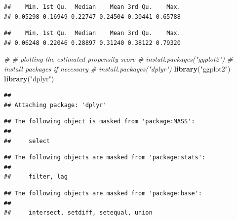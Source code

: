 \documentclass[
  10pt,
]{book}
\newenvironment{Shaded}{\begin{snugshade}}{\end{snugshade}}
\newcommand{\CommentTok}[1]{\textcolor[rgb]{0.56,0.35,0.01}{\textit{#1}}}
\newcommand{\DecValTok}[1]{\textcolor[rgb]{0.00,0.00,0.81}{#1}}
\newcommand{\KeywordTok}[1]{\textcolor[rgb]{0.13,0.29,0.53}{\textbf{#1}}}
\newcommand{\NormalTok}[1]{#1}
\newcommand{\OperatorTok}[1]{\textcolor[rgb]{0.81,0.36,0.00}{\textbf{#1}}}
\newcommand{\StringTok}[1]{\textcolor[rgb]{0.31,0.60,0.02}{#1}}
\begin{document}
\begin{verbatim}
##    Min. 1st Qu.  Median    Mean 3rd Qu.    Max. 
## 0.05298 0.16949 0.22747 0.24504 0.30441 0.65788
\end{verbatim}

\begin{Shaded}
\end{Shaded}

\begin{verbatim}
##    Min. 1st Qu.  Median    Mean 3rd Qu.    Max. 
## 0.06248 0.22046 0.28897 0.31240 0.38122 0.79320
\end{verbatim}

\begin{Shaded}
\begin{Highlighting}[]
\CommentTok{# # plotting the estimated propensity score}
\CommentTok{# install.packages("ggplot2") # install packages if necessary}
\CommentTok{# install.packages("dplyr")}
\KeywordTok{library}\NormalTok{(}\StringTok{"ggplot2"}\NormalTok{)}
\KeywordTok{library}\NormalTok{(}\StringTok{"dplyr"}\NormalTok{)}
\end{Highlighting}
\end{Shaded}

\begin{verbatim}
## 
## Attaching package: 'dplyr'
\end{verbatim}

\begin{verbatim}
## The following object is masked from 'package:MASS':
## 
##     select
\end{verbatim}

\begin{verbatim}
## The following objects are masked from 'package:stats':
## 
##     filter, lag
\end{verbatim}

\begin{verbatim}
## The following objects are masked from 'package:base':
## 
##     intersect, setdiff, setequal, union
\end{verbatim}
\end{document}
